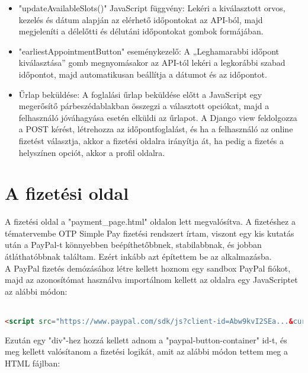 \begin{itemize}
	\item "updateAvailableSlots()" JavaScript függvény:
	Lekéri a kiválasztott orvos, kezelés és dátum alapján az elérhető időpontokat az API-ból, majd megjeleníti a délelőtti és délutáni időpontokat gombok formájában.
	\item "earliestAppointmentButton" eseménykezelő:
	A „Leghamarabbi időpont kiválasztása” gomb megnyomásakor az API-tól lekéri a legkorábbi szabad időpontot, majd automatikusan beállítja a dátumot és az időpontot.
	\item Űrlap beküldése:
	A foglalási űrlap beküldése előtt a JavaScript egy megerősítő párbeszédablakban összegzi a választott opciókat, majd a felhasználó jóváhagyása esetén elküldi az űrlapot. A Django view feldolgozza a POST kérést, létrehozza az időpontfoglalást, és ha a felhasználó az online fizetést választja, akkor a fizetési oldalra irányítja át, ha pedig a fizetés a helyszínen opciót, akkor a profil oldalra.
\end{itemize}

\section{A fizetési oldal}

A fizetési oldal a "payment\_page.html" oldalon lett megvalósítva. A fizetéshez a tématervembe OTP Simple Pay fizetési rendszert írtam, viszont egy kis kutatás után a PayPal-t könnyebben beépíthetőbbnek, stabilabbnak, és jobban átláthatóbbnak találtam. Ezért inkább azt építettem be az alkalmazásba.\\
A PayPal fizetés demózásához létre kellett hoznom egy sandbox PayPal fiókot, majd az azonosítómat használva importálnom kellett az oldalra egy JavaScriptet az alábbi módon: \\ \\

\begin{lstlisting}[caption={A PayPal sandbox importja},label={lst:stringstartswith}, language={HTML}]
<script src="https://www.paypal.com/sdk/js?client-id=Abw9kvI2SEa...&currency=HUF"></script>
\end{lstlisting}

Ezután egy "div"-hez hozzá kellett adnom a "paypal-button-container" id-t, és meg kellett valósítanom a fizetési logikát, amit az alábbi módon tettem meg a HTML fájlban:
 	

